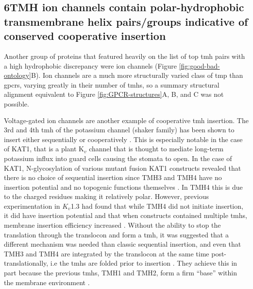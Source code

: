 \subsection{6TMH ion channels contain polar-hydrophobic transmembrane helix pairs/groups indicative of conserved cooperative insertion}

Another group of proteins that featured heavily on the list of top \gls{tmh} pairs with a high hydrophobic discrepancy were ion channels (Figure \ref{fig:good-bad-ontology}B).
Ion channels are a much more structurally varied class of \gls{tmp} than \gls{gpcr}s, varying greatly in their number of \gls{tmh}s, so a summary structural alignment equivalent to Figure \ref{fig:GPCR-structures}A, B, and C was not possible.

Voltage\--gated ion channels are another example of cooperative \gls{tmh} insertion.
The 3rd and 4th \gls{tmh} of the potassium channel (shaker family) has been shown to insert either sequentially or cooperatively \cite{Zhang2007, Cymer2015}.
This is especially notable in the case of KAT1, that is a plant K$_v$ channel that is thought to mediate long-term potassium influx into guard cells causing the stomata to open.
In the case of KAT1, N\--glycosylation of various mutant fusion KAT1 constructs revealed that there is no choice of sequential insertion since TMH3 and TMH4 have no insertion potential and no topogenic functions themselves \cite{Sato2002, Sato2003}.
In TMH4 this is due to the charged residues making it relatively polar.
However, previous experimentation in $K_{v}$1.3 had found that while TMH4 did not initiate insertion, it did have insertion potential and that when constructs contained multiple \gls{tmh}s, membrane insertion efficiency increased \cite{Tu2000}.
Without the ability to stop the translation through the translocon and form a \gls{tmh}, it was suggested that a different mechanism was needed than classic sequential insertion, and even that TMH3 and TMH4 are integrated by the translocon at the same time post-translationally, i.e the \gls{tmh}s are folded prior to insertion \cite{Sato2003}.
They achieve this in part because the previous \gls{tmh}s,  TMH1 and TMH2, form a firm ``base'' within the membrane environment \cite{Sato2003}.

